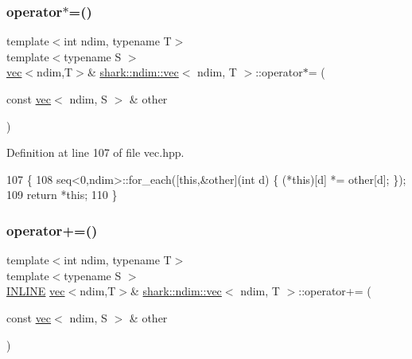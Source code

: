 \hypertarget{structshark_1_1ndim_1_1vec_af52bce704e4bd632c3844614007ca5ce}{}\label{structshark_1_1ndim_1_1vec_af52bce704e4bd632c3844614007ca5ce} 
\subsubsection{\texorpdfstring{operator$\ast$=()}{operator*=()}\hspace{0.1cm}{\footnotesize\ttfamily [2/2]}}
{\footnotesize\ttfamily template$<$int ndim, typename T$>$ \\
template$<$typename S $>$ \\
\hyperlink{structshark_1_1ndim_1_1vec}{vec}$<$ndim,T$>$\& \hyperlink{structshark_1_1ndim_1_1vec}{shark\+::ndim\+::vec}$<$ ndim, T $>$\+::operator$\ast$= (\begin{DoxyParamCaption}\item[{const \hyperlink{structshark_1_1ndim_1_1vec}{vec}$<$ ndim, S $>$ \&}]{other }\end{DoxyParamCaption})\hspace{0.3cm}{\ttfamily [inline]}}



Definition at line 107 of file vec.\+hpp.


\begin{DoxyCode}
107                                                                             \{
108             seq<0,ndim>::for\_each([\textcolor{keyword}{this},&other](\textcolor{keywordtype}{int} d) \{ (*this)[d] *= other[d]; \});
109             \textcolor{keywordflow}{return} *\textcolor{keyword}{this};
110         \}
\end{DoxyCode}
\hypertarget{structshark_1_1ndim_1_1vec_a126750e81729ae1c0ccfb60e1eff5ed0}{}\label{structshark_1_1ndim_1_1vec_a126750e81729ae1c0ccfb60e1eff5ed0} 
\subsubsection{\texorpdfstring{operator+=()}{operator+=()}\hspace{0.1cm}{\footnotesize\ttfamily [1/2]}}
{\footnotesize\ttfamily template$<$int ndim, typename T$>$ \\
template$<$typename S $>$ \\
\hyperlink{common_8hpp_a2eb6f9e0395b47b8d5e3eeae4fe0c116}{I\+N\+L\+I\+NE} \hyperlink{structshark_1_1ndim_1_1vec}{vec}$<$ndim,T$>$\& \hyperlink{structshark_1_1ndim_1_1vec}{shark\+::ndim\+::vec}$<$ ndim, T $>$\+::operator+= (\begin{DoxyParamCaption}\item[{const \hyperlink{structshark_1_1ndim_1_1vec}{vec}$<$ ndim, S $>$ \&}]{other }\end{DoxyParamCaption})}

